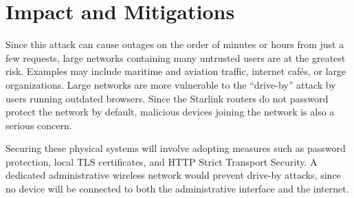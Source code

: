 \section{Impact and Mitigations}\label{sec:impact}

Since this attack can cause outages on the order of minutes or hours from just a few requests, large networks containing many untrusted users are at the greatest risk.
Examples may include maritime and aviation traffic, internet cafés, or large organizations.
Large networks are more vulnerable to the ``drive-by'' attack by users running outdated browsers.
Since the Starlink routers do not password protect the network by default, malicious devices joining the network is also a serious concern.

Securing these physical systems will involve adopting measures such as password protection, local TLS certificates, and HTTP Strict Transport Security.
A dedicated administrative wireless network would prevent drive-by attacks, since no device will be connected to both the administrative interface and the internet.
